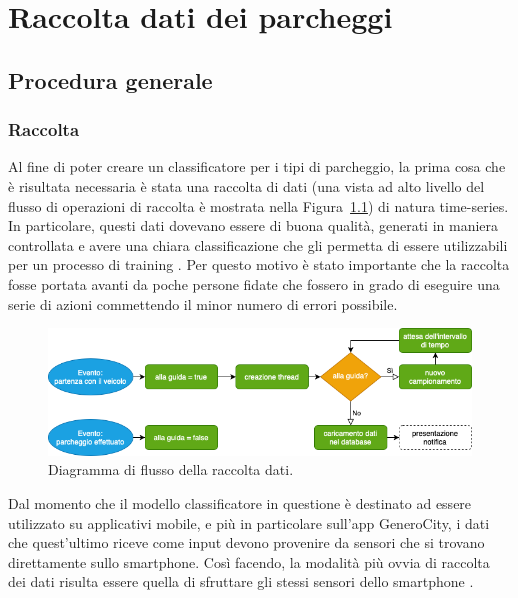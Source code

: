 \chapter{Raccolta dati dei parcheggi}
\section{Procedura generale} 

\subsection{Raccolta}
Al fine di poter creare un classificatore per i tipi di parcheggio, la prima cosa
che è risultata necessaria è stata una raccolta di dati (una vista ad alto livello del
flusso di operazioni di raccolta è mostrata nella 
Figura~\ref{fig:flow_diagram_raccolta_dati}) di natura time-series.
In particolare, questi dati
dovevano essere di buona qualità, generati in maniera controllata e avere una chiara
classificazione che gli permetta di essere utilizzabili per un processo di training
\cite{pattern_extraction_time_series}.
Per questo motivo è stato importante che la raccolta fosse portata
avanti da poche persone fidate che fossero in grado di eseguire una serie di azioni
commettendo il minor numero di errori possibile.\\
\begin{figure}[]
    \centering
    \includegraphics[width=14cm]{images/flow_diagram_raccolta_dati.png}
    \caption{Diagramma di flusso della raccolta dati.}
    \label{fig:flow_diagram_raccolta_dati}
\end{figure}
Dal momento che il modello classificatore in questione è destinato ad essere utilizzato
su applicativi mobile, e più in particolare sull'app GeneroCity, i dati che quest'ultimo
riceve come input devono provenire da sensori che si trovano direttamente sullo smartphone.
Così facendo, la modalità più ovvia di raccolta dei dati risulta essere 
quella di sfruttare gli stessi sensori dello smartphone
\cite{classification_smartphone_motion_sensors} \cite{driver_passenger_identification_smartphone}.\\
